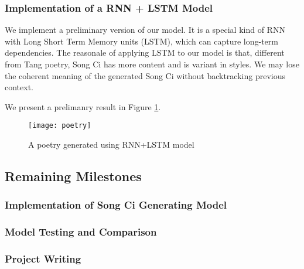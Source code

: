 \subsubsection{ Implementation of a RNN + LSTM Model  }   
We implement a preliminary version of our model. It is a special kind of RNN with Long Short Term Memory units (LSTM), which can capture long-term dependencies.
%
The reasonale of applying LSTM to our model is that,  different from Tang poetry, Song Ci has more content  and is variant in styles.
%
We may lose the coherent meaning of the generated Song Ci without backtracking previous context.
%

%
We present a prelimanry result in Figure \ref{fig:poetry}. 

 
\begin{figure}[htbp]
	\centering
	\texttt{[image: poetry]}
	\caption{A poetry generated using RNN+LSTM model}
	\label{fig:poetry}	
\end{figure} 


\subsection{Remaining Milestones}
%
\subsubsection{Implementation of Song Ci Generating Model }
\subsubsection{Model Testing and Comparison}
\subsubsection{Project Writing} 
